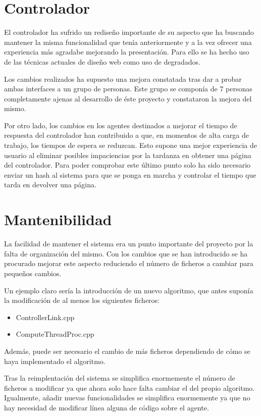 \section{Controlador}

El controlador ha sufrido un rediseño importante de su aspecto que ha buscando mantener la misma funcionalidad que tenía anteriormente y a la vez ofrecer una experiencia más agradabe mejorando la presentación. Para ello se ha hecho uso de las técnicas actuales de diseño web como uso de degradados.

Los cambios realizados ha supuesto una mejora constatada tras dar a probar ambas interfaces a un grupo de personas. Este grupo se componía de 7 personas completamente ajenas al desarrollo de éste proyecto y constataron la mejora del mismo.

Por otro lado, los cambios en los agentes destinados a mejorar el tiempo de respuesta del controlador han contribuido a que, en momentos de alta carga de trabajo, los tiempos de espera se reduzcan. Esto supone una mejor experiencia de usuario al eliminar posibles impaciencias por la tardanza en obtener una página del controlador. Para poder comprobar este último punto solo ha sido necesario enviar un hash al sistema para que se ponga en marcha y controlar el tiempo que tarda en devolver una página.

\section{Mantenibilidad}

La facilidad de mantener el sistema era un punto importante del proyecto por la falta de organización del mismo. Con los cambios que se han introducido se ha procurado mejorar este aspecto reduciendo el número de ficheros a cambiar para pequeños cambios.

Un ejemplo claro sería la introducción de un nuevo algoritmo, que antes suponía la modificación de al menos los siguientes ficheros:

\begin{itemize}
	\item ControllerLink.cpp
	\item ComputeThreadProc.cpp
\end{itemize}

Además, puede ser necesario el cambio de más ficheros dependiendo de cómo se haya implementado el algoritmo.

Tras la reimplentación del sistema se simplifica enormemente el número de ficheros a modificar ya que ahora solo hace falta cambiar el del propio algoritmo. Igualmente, añadir nuevas funcionalidades se simplifica enormemente ya que no hay necesidad de modificar línea alguna de código sobre el agente.

